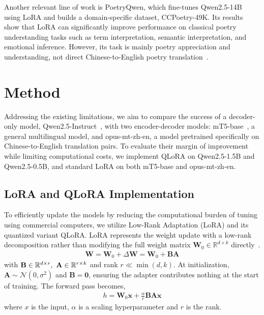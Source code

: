     Another relevant line of work is PoetryQwen, which fine-tunes Qwen2.5-14B using LoRA and builds a domain-specific dataset, CCPoetry-49K. Its results show that LoRA can significantly improve performance on classical poetry understanding tasks such as term interpretation, semantic interpretation, and emotional inference. However, its task is mainly poetry appreciation and understanding, not direct Chinese-to-English poetry translation~\cite{xie2025system}.

\section{Method}
     Addressing the existing limitations, we aim to compare the success of a decoder-only model, Qwen2.5-Instruct~\cite{qwen2.5, qwen2}, with two encoder-decoder models: mT5-base~\cite{xue2021mt5}, a general multilingual model, and opus-mt-zh-en, a model pretrained specifically on Chinese-to-English translation pairs. To evaluate their margin of improvement while limiting computational costs, we implement QLoRA on Qwen2.5-1.5B and Qwen2.5-0.5B, and standard LoRA on both mT5-base and opus-mt-zh-en.

    \subsection{LoRA and QLoRA Implementation}
    To efficiently update the models by reducing the computational burden of tuning using commercial computers, we utilize Low-Rank Adaptation (LoRA) and its quantized variant QLoRA. LoRA represents the weight update with a low-rank decomposition rather than modifying the full weight matrix $\mathbf{W}_0 \in \mathbb{R}^{d\times k}$ directly~\cite{dettmers2023qlora}.
    \begin{gather}
        \mathbf{W} = \mathbf{W}_0 + \Delta \mathbf{W} = \textbf{W}_0 + \textbf{BA}
    \end{gather}
    with $\textbf{B} \in \Bbb{R}^{d\times r},\ \textbf{A} \in \mathbb{R}^{r\times k}$ and rank $r \ll \min(d, k)$. At initialization, $\mathbf{A} \sim \mathcal{N}(0, \sigma^2)$ and $\mathbf{B} = \mathbf{0}$, ensuring the adapter contributes nothing at the start of training. The forward pass becomes,
    \begin{gather}
        h = \textbf{W}_0\textbf{x} + \tfrac{\alpha}{r}\textbf{BAx}
    \end{gather}
    where $x$ is the input, $\alpha$ is a scaling hyperparameter and $r$ is the rank.

